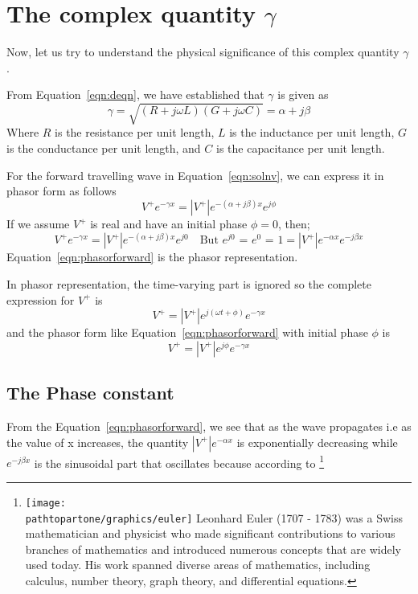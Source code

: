 
\section{The complex quantity $\gamma$}\label{lec:lec3}

Now, let us try to understand the physical significance of this complex quantity $\gamma$.

From Equation~\eqref{eqn:deqn}, we have established that $\gamma$ is given as
\begin{dmath}
\gamma = \sqrt{(R + j\omega L)(G + j\omega C)}
= \alpha + j\beta
\label{eqn:gamma}
\end{dmath}
Where $R$ is the resistance per unit length, $L$ is the inductance per unit length, $G$ is the conductance per unit length, and $C$ is the capacitance per unit length.

For the forward travelling wave in Equation~\eqref{eqn:solnv}, we can express it in phasor form as follows
\begin{equation}
V^+e^{-\gamma x} =\left|V^+\right|e^{-(\alpha + j\beta)x}e^{j\phi}
\end{equation}
If we assume $V^+$ is real and have an initial phase $\phi = 0$, then;
\begin{dmath}
V^+e^{-\gamma x} = \left| V^+\right| e^{-(\alpha + j\beta)x}e^{j0}\quad\text{But }e^{j0}\text{ = }e^0\text{ = }1
= \left| V^+\right| e^{-\alpha x}e^{-j\beta x}
\label{eqn:phasorforward}
\end{dmath}
Equation~\eqref{eqn:phasorforward} is the phasor representation.

In phasor representation, the time-varying part is ignored so the complete expression for $V^+$ is 
\begin{equation*}
V^+ = \left|V^+\right|e^{j(\omega t + \phi)} e^{-\gamma x} 
\end{equation*}
and the phasor form like Equation~\eqref{eqn:phasorforward} with initial phase $\phi$ is
\begin{equation*}
V^+ = \left|V^+\right|e^{j\phi} e^{-\gamma x}
\end{equation*}

\subsection{The Phase constant}
From the Equation~\eqref{eqn:phasorforward}, we see that as the wave propagates i.e as the value of x increases, the quantity $\left|V^+\right|e^{-\alpha x}$ is exponentially decreasing while $e^{-j\beta x}$ is the sinusoidal part that oscillates because according to \footnote{
\texttt{[image: \\pathtopartone/graphics/euler]}
Leonhard Euler (1707 - 1783) was a Swiss mathematician and physicist who made significant contributions to various branches of mathematics and introduced numerous concepts that are widely used today. His work spanned diverse areas of mathematics, including calculus, number theory, graph theory, and differential equations.
}

